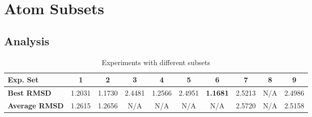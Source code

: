 \section{Atom Subsets}

\subsection{Analysis}

\begin{table}
	\centering
	\begin{tabular}{ | >{\bfseries}p{1.9cm} | c | c | c | c | c | c | c | c | c | }
		\hline
		Exp. Set & 1 & 2 & 3 & 4 & 5 & 6 & 7 & 8 & 9 \\ \hline
		Best RMSD & 1.2031 & 1.1730 & 2.4481 & 1.2566 & 2.4951 & \textbf{1.1681} & 2.5213 & N/A & 2.4986 \\ \hline
		Average RMSD & 1.2615 & 1.2656 & N/A & N/A & N/A & N/A & 2.5720 & N/A & 2.5158 \\ \hline
	\end{tabular}
	\caption{Experiments with different subsets}
	\label{table:subset-results}
\end{table}

